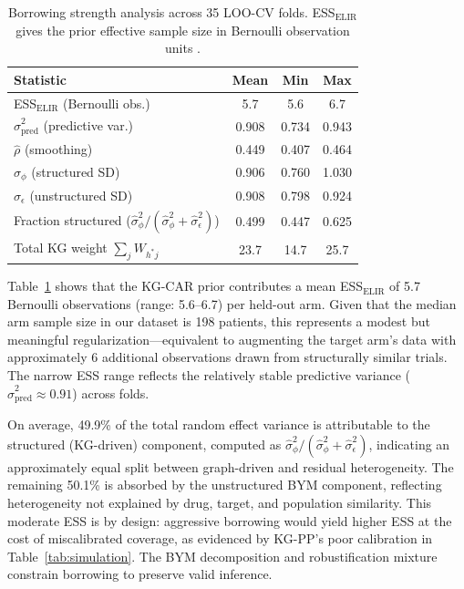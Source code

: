 \documentclass[12pt]{article}
\begin{document}
\begin{table}[ht]
\centering
\caption{Borrowing strength analysis across 35 LOO-CV folds. ESS$_{\text{ELIR}}$ gives the prior effective sample size in Bernoulli observation units \citep{neuenschwander2020predictively}.}
\label{tab:ess}
\begin{tabular}{lccc}
\toprule
Statistic & Mean & Min & Max \\
\midrule
ESS$_{\text{ELIR}}$ (Bernoulli obs.) & 5.7 & 5.6 & 6.7 \\
$\hat{\sigma}^2_{\text{pred}}$ (predictive var.) & 0.908 & 0.734 & 0.943 \\
$\hat{\rho}$ (smoothing) & 0.449 & 0.407 & 0.464 \\
$\hat{\sigma}_\phi$ (structured SD) & 0.906 & 0.760 & 1.030 \\
$\hat{\sigma}_\epsilon$ (unstructured SD) & 0.908 & 0.798 & 0.924 \\
Fraction structured ($\hat{\sigma}_\phi^2 / (\hat{\sigma}_\phi^2 + \hat{\sigma}_\epsilon^2)$) & 0.499 & 0.447 & 0.625 \\
Total KG weight $\sum_j W_{h^*j}$ & 23.7 & 14.7 & 25.7 \\
\bottomrule
\end{tabular}
\end{table}

Table~\ref{tab:ess} shows that the KG-CAR prior contributes a mean ESS$_{\text{ELIR}}$ of 5.7 Bernoulli observations (range: 5.6--6.7) per held-out arm. Given that the median arm sample size in our dataset is 198 patients, this represents a modest but meaningful regularization---equivalent to augmenting the target arm's data with approximately 6 additional observations drawn from structurally similar trials. The narrow ESS range reflects the relatively stable predictive variance ($\hat\sigma^2_{\text{pred}} \approx 0.91$) across folds.

On average, 49.9\% of the total random effect variance is attributable to the structured (KG-driven) component, computed as $\hat{\sigma}_\phi^2 / (\hat{\sigma}_\phi^2 + \hat{\sigma}_\epsilon^2)$, indicating an approximately equal split between graph-driven and residual heterogeneity. The remaining 50.1\% is absorbed by the unstructured BYM component, reflecting heterogeneity not explained by drug, target, and population similarity. This moderate ESS is by design: aggressive borrowing would yield higher ESS at the cost of miscalibrated coverage, as evidenced by KG-PP's poor calibration in Table~\ref{tab:simulation}. The BYM decomposition and robustification mixture constrain borrowing to preserve valid inference.
\end{document}
